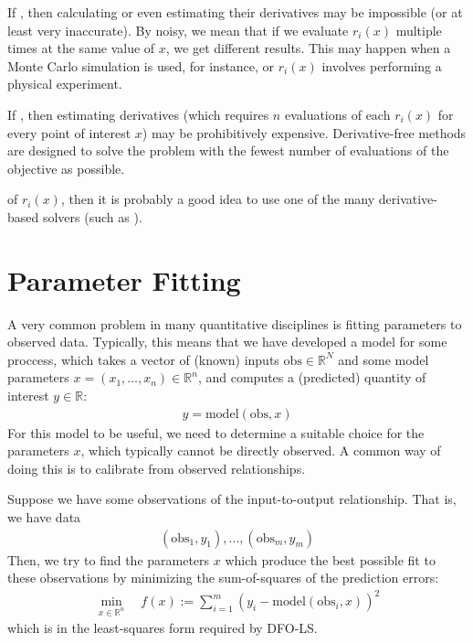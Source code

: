 \documentclass[letterpaper,10pt,english]{sphinxmanual}
\begin{document}
If , then calculating or even estimating their derivatives may be impossible (or at least very inaccurate). By noisy, we mean that if we evaluate \(r_i(x)\) multiple times at the same value of \(x\), we get different results. This may happen when a Monte Carlo simulation is used, for instance, or \(r_i(x)\) involves performing a physical experiment.

If , then estimating derivatives (which requires \(n\) evaluations of each \(r_i(x)\) for every point of interest \(x\)) may be prohibitively expensive. Derivative-free methods are designed to solve the problem with the fewest number of evaluations of the objective as possible.

 of \(r_i(x)\), then it is probably a good idea to use one of the many derivative-based solvers (such as ).


\section{Parameter Fitting}
\label{\detokenize{info:parameter-fitting}}
A very common problem in many quantitative disciplines is fitting parameters to observed data. Typically, this means that we have developed a model for some proccess, which takes a vector of (known) inputs \(\mathrm{obs}\in\mathbb{R}^N\) and some model parameters \(x=(x_1, \ldots, x_n)\in\mathbb{R}^n\), and computes a (predicted) quantity of interest \(y\in\mathbb{R}\):
\begin{equation*}
\begin{split}y = \mathrm{model}(\mathrm{obs}, x)\end{split}
\end{equation*}
For this model to be useful, we need to determine a suitable choice for the parameters \(x\), which typically cannot be directly observed. A common way of doing this is to calibrate from observed relationships.

Suppose we have some observations of the input-to-output relationship. That is, we have data
\begin{equation*}
\begin{split}(\mathrm{obs}_1, y_1), \ldots, (\mathrm{obs}_m, y_m)\end{split}
\end{equation*}
Then, we try to find the parameters \(x\) which produce the best possible fit to these observations by minimizing the sum-of-squares of the prediction errors:
\begin{equation*}
\begin{split}\min_{x\in\mathbb{R}^n}  \quad  f(x) := \sum_{i=1}^{m}(y_i - \mathrm{model}(\mathrm{obs}_i, x))^2\end{split}
\end{equation*}
which is in the least-squares form required by DFO-LS.
\end{document}
